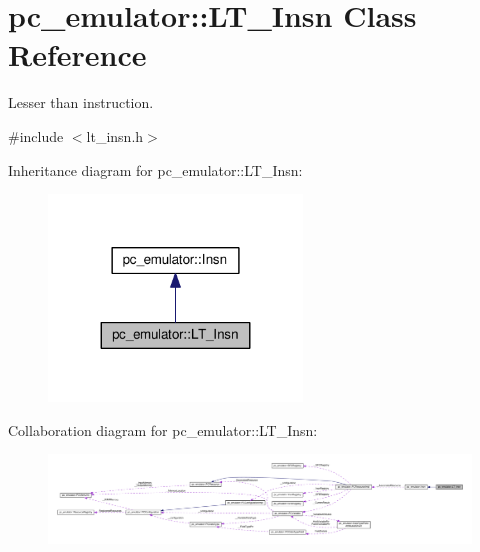 \hypertarget{classpc__emulator_1_1LT__Insn}{}\section{pc\+\_\+emulator\+:\+:L\+T\+\_\+\+Insn Class Reference}
\label{classpc__emulator_1_1LT__Insn}


Lesser than instruction.  




{\ttfamily \#include $<$lt\+\_\+insn.\+h$>$}



Inheritance diagram for pc\+\_\+emulator\+:\+:L\+T\+\_\+\+Insn\+:
\nopagebreak
\begin{figure}[H]
\begin{center}
\leavevmode
\includegraphics[width=191pt]{classpc__emulator_1_1LT__Insn__inherit__graph}
\end{center}
\end{figure}


Collaboration diagram for pc\+\_\+emulator\+:\+:L\+T\+\_\+\+Insn\+:
\nopagebreak
\begin{figure}[H]
\begin{center}
\leavevmode
\includegraphics[width=350pt]{classpc__emulator_1_1LT__Insn__coll__graph}
\end{center}
\end{figure}

